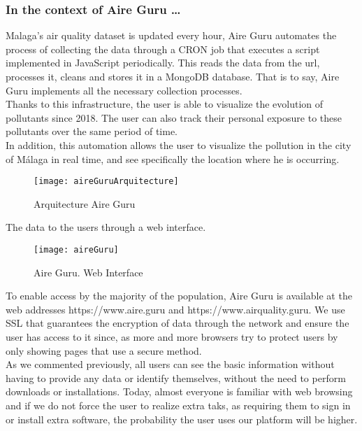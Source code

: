 \subsubsection*{In the context of Aire Guru \ldots} 

Malaga's air quality dataset is updated every hour, Aire Guru automates the process of collecting the
data through a CRON job that executes a script implemented in JavaScript periodically. This reads the data from the url, processes it,
cleans and stores it in a MongoDB database. That is to say, Aire Guru implements all the necessary collection processes.\\

Thanks to this infrastructure, the user is able to visualize the evolution of pollutants since 2018. The user can also track their personal exposure
 to these pollutants over the same period of time.\\

In addition, this automation allows the user to visualize the pollution in the city of Málaga in real time, and see specifically the location where he is 
occurring. \\

\begin{figure}[ht]
    \centering
    \texttt{[image: aireGuruArquitecture]}
    \caption{Arquitecture Aire Guru}
\end{figure}

The data to the users through a web interface. \\

\begin{figure}[ht]
    \centering
    \texttt{[image: aireGuru]}
    \caption{Aire Guru. Web Interface}
\end{figure}

To enable access by the majority of the population, Aire Guru is available at the web addresses https://www.aire.guru and https://www.airquality.guru.
We use SSL that guarantees the encryption of data through the network and ensure the user has access to it since, as more and more browsers try to protect 
users by only showing pages that use a secure method.\\

As we commented previously, all users can see the basic information without having to provide any data or identify themselves, without the need to
perform downloads or installations. Today, almost everyone is familiar with web browsing and if we do not force the user to realize extra taks, as 
requiring them to sign in or install extra software, the probability the user uses our platform will be higher. 

